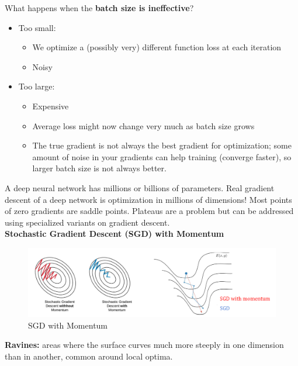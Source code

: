 \begin{warning}
    What happens when the \textbf{batch size is ineffective}?
    \begin{itemize}
        \item Too small:
        \begin{itemize}
            \item We optimize a (possibly very) different function loss at each iteration
            \item Noisy
        \end{itemize}
        \item Too large:
        \begin{itemize}
            \item Expensive
            \item Average loss might now change very much as batch size grows
            \item The true gradient is not always the best gradient for optimization; some
amount of noise in your gradients can help training (converge faster), so
larger batch size is not always better.
        \end{itemize}
    \end{itemize}
\end{warning}

A deep neural network has millions or billions of parameters.
Real gradient descent of a deep network is optimization in millions
of dimensions!
Most points of zero gradients are saddle points.
Plateaus are a problem but can be addressed using specialized
variants on gradient descent.\\

\noindent\textbf{Stochastic Gradient Descent (SGD) with Momentum}
\begin{figure}[h!t]
    \centering
    \includegraphics[width=0.7\linewidth]{SGDWM.png}
    \caption{SGD with Momentum}
    \label{fig:enter-label}
\end{figure}
\begin{definition}
    \textbf{Ravines:}  areas where the surface curves much more steeply in one dimension than in
another, common around local optima.
\end{definition}

